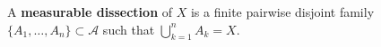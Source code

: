 A \textbf{measurable dissection} of $X$ is a finite pairwise disjoint family $\{A_1, \ldots, A_n\} \subset \mathcal{A}$ such that $\bigcup_{k=1}^{n} A_k = X$.
